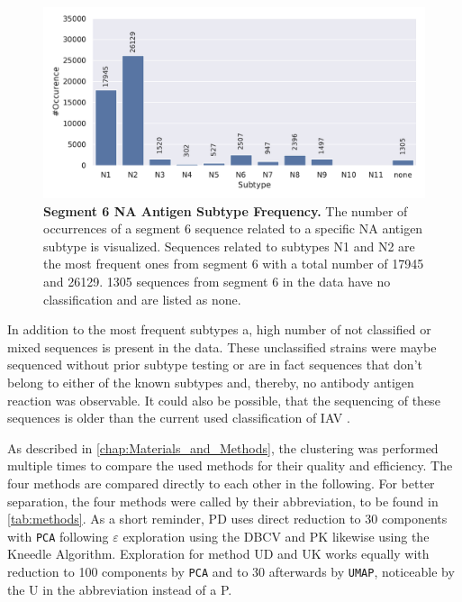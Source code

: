 \begin{figure}[!hbt]
    \centering
    \includegraphics[width=\textwidth]{PCA/Data_Overview_Segment_6_N.pdf}
    \caption[Segment 6 \Acrlong{NA} Antigen Subtype Frequency]{\textbf{Segment 6 \Acrlong{NA} Antigen Subtype Frequency.} The number of occurrences of a segment 6 sequence related to a specific \gls{NA} antigen subtype is visualized. Sequences related to subtypes N1 and N2 are the most frequent ones from segment 6 with a total number of 17945 and 26129. 1305 sequences from segment 6 in the data have no classification and are listed as \glqq none\grqq{}.}
    \label{fig:Frequency_6}
\end{figure}

In addition to the most frequent subtypes a, high number of not classified or \glqq mixed\grqq{} sequences is present in the data. These unclassified strains were maybe sequenced without prior subtype testing or are in fact sequences that don't belong to either of the known subtypes and, thereby, no antibody antigen reaction was observable. It could also be possible, that the sequencing of these sequences is older than the current used classification of \gls{IAV} \autocite{noauthor_revision_1980}. 

As described in \autoref{chap:Materials_and_Methods}, the clustering was performed multiple times to compare the used methods for their quality and efficiency. The four methods are compared directly to each other in the following. For better separation, the four methods were called by their abbreviation, to be found in \autoref{tab:methods}. As a short reminder, PD uses direct reduction to 30 components with \texttt{PCA} following $\varepsilon$ exploration using the \gls{DBCV} and PK likewise using the Kneedle Algorithm. Exploration for method UD and UK works equally with reduction to 100 components by \texttt{PCA} and to 30 afterwards by \texttt{UMAP}, noticeable by the U in the abbreviation instead of a P.   

